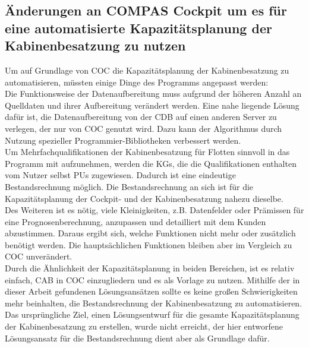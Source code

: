 \documentclass [12pt, a4paper, oneside, titlepage, ngerman]{article}
\begin{document}
\subsection{Änderungen an COMPAS Cockpit um es für eine automatisierte Kapazitätsplanung der Kabinenbesatzung zu nutzen}
Um auf Grundlage von \ac{COC} die Kapazitätsplanung der Kabinenbesatzung zu automatisieren, müssten einige Dinge des Programms angepasst werden: \\
Die Funktionsweise der Datenaufbereitung muss aufgrund der höheren Anzahl an Quelldaten und ihrer Aufbereitung verändert werden. Eine nahe liegende Lösung dafür ist, die Datenaufbereitung von der \ac{CDB} auf einen anderen Server zu verlegen, der nur von \ac{COC} genutzt wird. Dazu kann der Algorithmus durch Nutzung spezieller Programmier-Bibliotheken verbessert werden. \\
Um Mehrfachqualifikationen der Kabinenbesatzung für Flotten sinnvoll in das Programm mit aufzunehmen, werden die \acp{KG}, die die Qualifikationen enthalten vom Nutzer selbst \acp{PU} zugewiesen. Dadurch ist eine eindeutige Bestandsrechnung möglich. Die Bestandsrechnung an sich ist für die Kapazitätsplanung der Cockpit- und der Kabinenbesatzung nahezu dieselbe. \\
Des Weiteren ist es nötig, viele Kleinigkeiten, z.B. Datenfelder oder Prämissen für eine Prognosenberechnung, anzupassen und detailliert mit dem Kunden abzustimmen. Daraus ergibt sich, welche Funktionen nicht mehr oder zusätzlich benötigt werden. Die hauptsächlichen Funktionen bleiben aber im Vergleich zu \ac{COC} unverändert. \\
Durch die Ähnlichkeit der Kapazitätsplanung in beiden Bereichen, ist es relativ einfach, \ac{CAB} in \ac{COC} einzugliedern und es als Vorlage zu nutzen. Mithilfe der in dieser Arbeit gefundenen Lösungsansätzen sollte es keine großen Schwierigkeiten mehr beinhalten, die Bestandsrechnung der Kabinenbesatzung zu automatisieren. \\
Das ursprüngliche Ziel, einen Lösungsentwurf für die gesamte Kapazitätsplanung der Kabinenbesatzung zu erstellen, wurde nicht erreicht, der hier entworfene Lösungsansatz für die Bestandsrechnung dient aber als Grundlage dafür.
\end{document}
